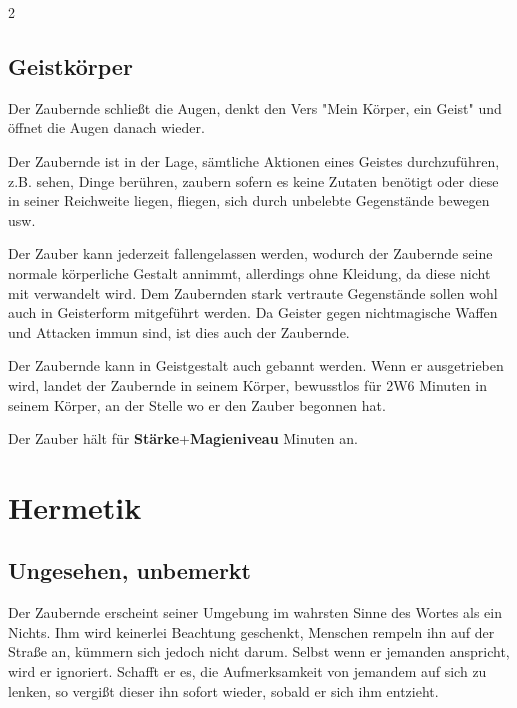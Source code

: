 \begin{multicols*}{2}


\subsection{Geistkörper}

Der Zaubernde schließt die Augen, denkt den Vers "Mein Körper, ein Geist" und öffnet die Augen danach wieder.

Der Zaubernde ist in der Lage, sämtliche Aktionen eines Geistes durchzuführen, z.B. sehen, Dinge berühren, zaubern sofern es keine Zutaten benötigt oder diese in seiner Reichweite liegen, fliegen, sich durch unbelebte Gegenstände bewegen usw.

Der Zauber kann jederzeit fallengelassen werden, wodurch der Zaubernde seine normale körperliche Gestalt annimmt, allerdings ohne Kleidung, da diese nicht mit verwandelt wird. Dem Zaubernden stark vertraute Gegenstände sollen wohl auch in Geisterform mitgeführt werden. Da Geister gegen nichtmagische Waffen und Attacken immun sind, ist dies auch der Zaubernde.

Der Zaubernde kann in Geistgestalt auch gebannt werden. Wenn er ausgetrieben wird, landet der Zaubernde in seinem Körper, bewusstlos für 2W6 Minuten in seinem Körper, an der Stelle wo er den Zauber begonnen hat.

Der Zauber hält für \textbf{Stärke}+\textbf{Magieniveau} Minuten an.



\section{Hermetik}

\subsection{Ungesehen, unbemerkt}

Der Zaubernde erscheint seiner Umgebung im wahrsten Sinne des Wortes als ein Nichts. Ihm wird keinerlei Beachtung geschenkt, Menschen rempeln ihn auf der Straße an, kümmern sich jedoch nicht darum. Selbst wenn er jemanden anspricht, wird er ignoriert. Schafft er es, die Aufmerksamkeit von jemandem auf sich zu lenken, so vergißt dieser ihn sofort wieder, sobald er sich ihm entzieht.


\end{multicols*}
